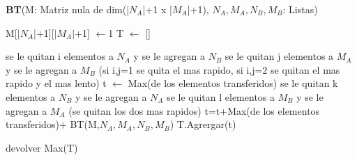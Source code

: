 \documentclass[spanish,12pt]{article}
\begin{document}

\begin{algorithm}[H]{\textbf{BT}(M: Matriz nula de dim(|$N_A$|+1 x |$M_A$|+1), $N_A, M_A, N_{B}, M_{B}$: Listas) }
	\begin{algorithmic}
		\State M[$|N_A$|+1][$|M_A|$+1] $\gets$1
		\State T $\gets$ []
		
					\State se le quitan i elementos a $N_A$ y se le agregan a $N_B$
					\State se le quitan j elementos a $M_A$ y se le agregan a $M_B$
					\State (si i,j=1 se quita el mas rapido, si i,j=2 se quitan el mas rapido y el mas lento)
					\State t $\gets$ Max(de los elementos transferidos)
							\State se le quitan k elementos a $N_B$ y se le agregan a $N_A$
							\State se le quitan l elementos a $M_B$ y se le agregan a $M_A$
							\State (se quitan los dos mas rapidos)
							\State t=t+Max(de los elementos transferidos)+ BT(M,$N_A,M_A,N_B,M_B$)
							\State T.Agrergar(t)
							\endIf
						\endWhile
					\endWhile
				\endIf
			\endWhile			
		\endWhile

\State devolver Max(T)

	\end{algorithmic}
\end{algorithm}
\end{document}
